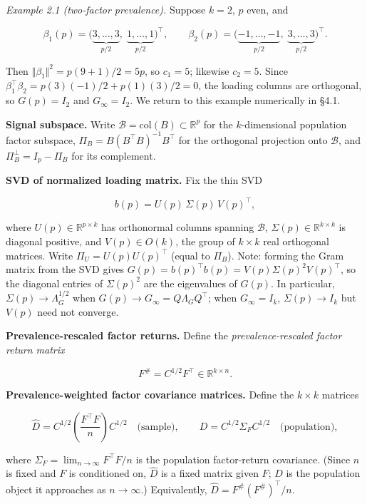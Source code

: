 \documentclass{article}
\theoremstyle{remark}
\begin{document}
\textit{Example 2.1 (two-factor prevalence).} Suppose $k=2$, $p$ even, and

\[
\beta_1(p) = \bigl(\underbrace{3,\ldots,3}_{p/2},\;\underbrace{1,\ldots,1}_{p/2}\bigr)^\top,\qquad \beta_2(p) = \bigl(\underbrace{-1,\ldots,-1}_{p/2},\;\underbrace{3,\ldots,3}_{p/2}\bigr)^\top.
\]

Then $\Vert \beta_1\Vert^2 = p(9+1)/2 = 5p$, so $c_1 = 5$; likewise $c_2 = 5$. Since $\beta_1^\top\beta_2 = p(3)(-1)/2 + p(1)(3)/2 = 0$, the loading columns are orthogonal, so $G(p) = I_2$ and $G_\infty = I_2$. We return to this example numerically in §4.1.

\textbf{Signal subspace.} Write $\mathcal{B} = \mathrm{col}(B) \subset \mathbb{R}^p$ for the $k$-dimensional population factor subspace, $\Pi_B = B(B^\top B)^{-1}B^\top$ for the orthogonal projection onto $\mathcal{B}$, and $\Pi_B^\perp = I_p - \Pi_B$ for its complement.

\textbf{SVD of normalized loading matrix.} Fix the thin SVD

\[
b(p) = U(p)\,\Sigma(p)\,V(p)^\top, \tag{1}
\]

where $U(p)\in\mathbb{R}^{p\times k}$ has orthonormal columns spanning $\mathcal{B}$, $\Sigma(p)\in\mathbb{R}^{k\times k}$ is diagonal positive, and $V(p)\in O(k)$, the group of $k\times k$ real orthogonal matrices. Write $\Pi_U = U(p)U(p)^\top$ (equal to $\Pi_B$). Note: forming the Gram matrix from the SVD gives $G(p) = b(p)^\top b(p) = V(p)\Sigma(p)^2 V(p)^\top$, so the diagonal entries of $\Sigma(p)^2$ are the eigenvalues of $G(p)$. In particular, $\Sigma(p) \to \Lambda_G^{1/2}$ when $G(p)\to G_\infty = Q\Lambda_G Q^\top$; when $G_\infty = I_k$, $\Sigma(p)\to I_k$ but $V(p)$ need not converge.

\textbf{Prevalence-rescaled factor returns.} Define the \textit{prevalence-rescaled factor return matrix}

\[
F^\# = C^{1/2}F^\top \in \mathbb{R}^{k\times n}.
\]

\textbf{Prevalence-weighted factor covariance matrices.} Define the $k\times k$ matrices

\[
\hat{D} = C^{1/2}\!\left(\frac{F^\top F}{n}\right)C^{1/2} \quad\text{(sample)}, \qquad D = C^{1/2}\Sigma_F C^{1/2} \quad\text{(population)},
\]

where $\Sigma_F = \lim_{n\to\infty} F^\top F/n$ is the population factor-return covariance. (Since $n$ is fixed and $F$ is conditioned on, $\hat{D}$ is a fixed matrix given $F$; $D$ is the population object it approaches as $n\to\infty$.) Equivalently, $\hat{D} = F^\#(F^\#)^\top/n$.
\end{document}
